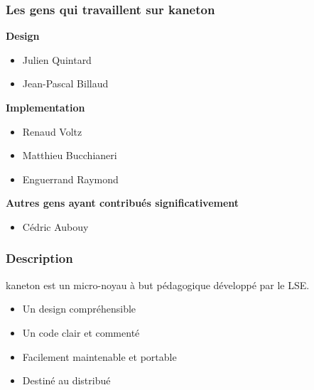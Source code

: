 \begin{frame}
  \frametitle{Les gens qui travaillent sur kaneton}

  \textbf{Design}

  \begin{itemize}
    \item
      Julien Quintard
    \item
      Jean-Pascal Billaud
  \end{itemize}

  \nl

  \textbf{Implementation}

  \begin{itemize}
    \item
      Renaud Voltz
    \item
      Matthieu Bucchianeri
    \item
      Enguerrand Raymond
  \end{itemize}

  \nl

  \textbf{Autres gens ayant contribu\'{e}s significativement}

  \begin{itemize}
    \item
      C\'{e}dric Aubouy
  \end{itemize}
\end{frame}


\begin{frame}
  \frametitle{Description}

  kaneton est un micro-noyau \`{a} but p\'{e}dagogique
  d\'{e}velopp\'{e} par le LSE.

  \-

  \begin{itemize}
  \item
    Un design compr\'{e}hensible
  \item
    Un code clair et comment\'{e}
  \item
    Facilement maintenable et portable
  \item
    Destin\'{e} au distribu\'{e}
  \end{itemize}

\end{frame}


